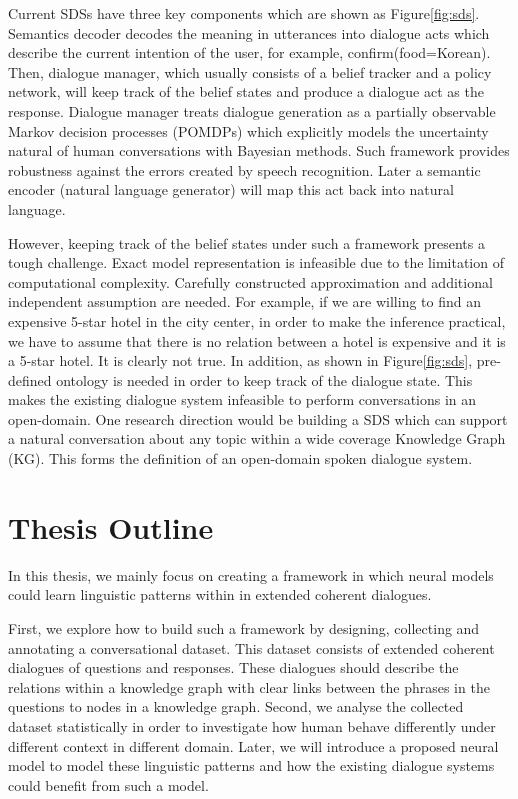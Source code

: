 \documentclass[bsc,frontabs,twoside,singlespacing,parskip,deptreport]{infthesis}     %
\begin{document}
Current SDSs have three key components which are shown as Figure\ref{fig:sds}. Semantics decoder decodes the meaning in utterances into dialogue acts which describe the current intention of the user, for example, confirm(food=Korean). Then, dialogue manager, which usually consists of a belief tracker and a policy network, will keep track of the belief states and produce a dialogue act as the response. Dialogue manager treats dialogue generation as a partially observable Markov decision processes (POMDPs)\cite{williams2007partially,young2013pomdp,young2010hidden} which explicitly models the uncertainty natural of human conversations with Bayesian methods. Such framework provides robustness against the errors created by speech recognition. Later a semantic encoder (natural language generator) will map this act back into natural language.

However, keeping track of the belief states under such a framework presents a tough challenge. Exact model representation is infeasible due to the limitation of computational complexity\cite{young2013pomdp}. Carefully constructed approximation and additional independent assumption are needed. For example, if we are willing to find an expensive 5-star hotel in the city center, in order to make the inference practical, we have to assume that there is no relation between a hotel is expensive and it is a 5-star hotel. It is clearly not true. In addition, as shown in Figure\ref{fig:sds}, pre-defined ontology is needed in order to keep track of the dialogue state. This makes the existing dialogue system infeasible to perform conversations in an open-domain. One research direction would be building a SDS which can support a natural conversation about any topic within a wide coverage Knowledge Graph (KG). This forms the definition of an open-domain spoken dialogue system\cite{opendomain}.




\section {Thesis Outline}

In this thesis, we mainly focus on creating a framework in which neural models could learn linguistic patterns within in extended coherent dialogues.

First, we explore how to build such a framework by designing, collecting and annotating a conversational dataset. This dataset consists of extended coherent dialogues of questions and responses. These dialogues should describe the relations within a knowledge graph with clear links between the phrases in the questions to nodes in a knowledge graph. Second, we analyse the collected dataset statistically in order to investigate how human behave differently under different context in different domain. Later, we will introduce a proposed neural model to model these linguistic patterns and how the existing dialogue systems could benefit from such a model.
\end{document}
